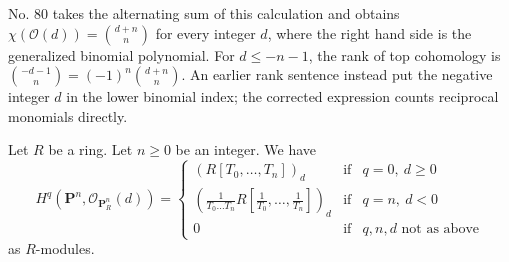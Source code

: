 \begin{lemma}
\begin{history}
No. 80 takes the alternating sum of this calculation and obtains
$\chi(\mathcal{O}(d)) = \binom{d + n}{n}$ for every integer $d$, where the
right hand side is the generalized binomial polynomial. For
$d \leq -n - 1$, the rank of top cohomology is
$\binom{-d - 1}{n} = (-1)^n\binom{d + n}{n}$. An earlier rank sentence
instead put the negative integer $d$ in the lower binomial index; the
corrected expression counts reciprocal monomials directly.
\end{history}
Let $R$ be a ring.
Let $n \geq 0$ be an integer.
We have
$$
H^q(\mathbf{P}^n, \mathcal{O}_{\mathbf{P}^n_R}(d)) =
\left\{
\begin{matrix}
(R[T_0, \ldots, T_n])_d & \text{if} & q = 0,\ d \geq 0 \\
\left(\frac{1}{T_0 \ldots T_n} R[\frac{1}{T_0}, \ldots, \frac{1}{T_n}]\right)_d
& \text{if} & q = n,\ d < 0 \\
0 & \text{if} & q, n, d\text{ not as above}
\end{matrix}
\right.
$$
as $R$-modules.
\end{lemma}

